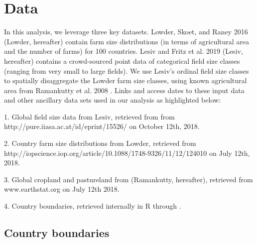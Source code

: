 \documentclass{article}\usepackage[]{graphicx}\usepackage[]{xcolor}
\begin{document}
\section{Data}

In this analysis, we leverage three key datasets. Lowder, Skoet, and Raney 2016 \cite{Lowder} (Lowder, hereafter) contain farm size distributions (in terms of agricultural area and the number of farms) for 100 countries. Lesiv and Fritz et al. 2019 \cite{Lesiv} (Lesiv, hereafter) contains a crowd-sourced point data of categorical field size classes (ranging from very small to large fields). We use Lesiv’s ordinal field size classes to spatially disaggregate the Lowder farm size classes, using known agricultural area from Ramankutty et al. 2008 \cite{Ramankutty}. Links and access dates to these input data and other ancillary data sets used in our analysis as highlighted below:

1. Global field size data from Lesiv, retrieved from from http://pure.iiasa.ac.at/id/eprint/15526/ on October 12th, 2018.

2. Country farm size distributions from Lowder, retrieved from 
http://iopscience.iop.org/article/10.1088/1748-9326/11/12/124010 on July 12th, 2018.

3. Global cropland and pastureland from \cite{Ramankutty} (Ramankutty, hereafter), retrieved from www.earthstat.org on July 12th 2018.

4. Country boundaries, retrieved internally in R through \cite{R-rworldmap}.


\subsection{Country boundaries}
\end{document}
